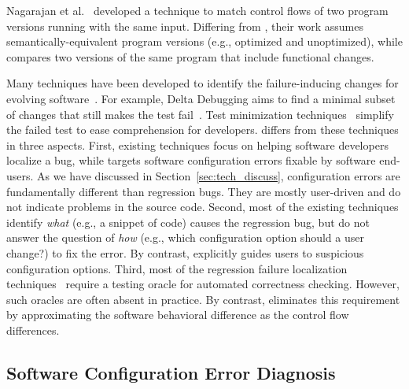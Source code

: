 Nagarajan et al.~\cite{4362621} developed a technique to match
control flows of two program versions running with
the same input. Differing from \ourtool, their
work assumes semantically-equivalent program versions (e.g., optimized
and unoptimized), while \ourtool compares two versions
of the same program that include functional changes. 

Many techniques have been developed to identify the
failure-inducing changes for evolving
software~\cite{Banerjee:2010:GID, r2fix, Qi:2009:DAD, Hoffman:2009:STA}.
For example, Delta Debugging aims to find a minimal
subset of changes that still makes the test fail~\cite{dd}.
Test minimization techniques~\cite{Hoffman:2009:STA, Zhang:2013:PST}
simplify the failed
test to ease comprehension for developers. 
\ourtool differs from these techniques in three aspects.
First, existing techniques focus on helping software developers
localize a bug, while \ourtool targets software
configuration errors fixable by software end-users.
As we have discussed in Section~\ref{sec:tech_discuss},
configuration errors are fundamentally different than regression bugs.
They are mostly user-driven and do not indicate problems in the source
code. Second, most of the existing techniques identify
\textit{what} (e.g., a snippet of code) causes the
regression bug, but do not answer
the question of \textit{how} (e.g., which
configuration option should a user change?) to
fix the error. By contrast, \ourtool
explicitly guides users to suspicious configuration options.
Third, most of the regression failure localization
techniques~\cite{dd} require 
a testing oracle for automated correctness checking. However,
such oracles are often absent in practice.
By contrast, \ourtool eliminates this requirement by
approximating the software behavioral difference as the control
flow differences.


\subsection{Software Configuration Error Diagnosis}

